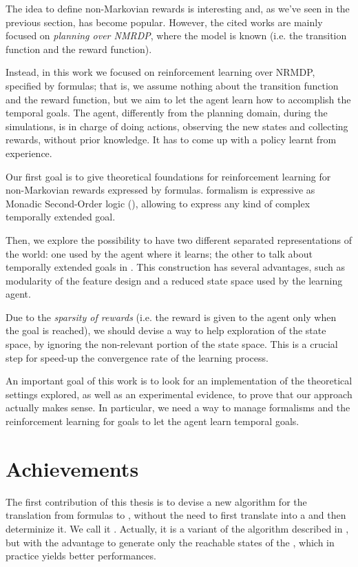 The idea to define non-Markovian rewards is interesting and, as we've seen in the previous section, has become popular. However, the cited works are mainly focused on \emph{planning over NMRDP}, where the model is known (i.e. the transition function and the reward function). 

Instead, in this work we focused on reinforcement learning over NRMDP, specified by \LLf formulas; that is, we assume nothing about the transition function and the reward function, but we aim to let the agent learn how to accomplish the temporal goals. The agent, differently from the planning domain, during the simulations, is in charge of doing actions, observing the new states and collecting rewards, without prior knowledge. It has to come up with a policy learnt from experience.

Our first goal is to give theoretical foundations for reinforcement learning for non-Markovian rewards expressed by \LLf formulas. \LDLf formalism is expressive as Monadic Second-Order logic (\MSO), allowing to express any kind of complex temporally extended goal.

Then, we explore the possibility to have two different separated representations of the world: one used by the agent where it learns; the other to talk about temporally extended goals in \LLf. This construction has several advantages, such as modularity of the feature design and a reduced state space used by the learning agent.

Due to the \emph{sparsity of rewards} (i.e. the reward is given to the agent only when the goal is reached), we should devise a way to help exploration of the state space, by ignoring the non-relevant portion of the state space. This is a crucial step for speed-up the convergence rate of the learning process.

An important goal of this work is to look for an implementation of the theoretical settings explored, as well as an experimental evidence, to prove that our approach actually makes sense. In particular, we need a way to manage \LLf formalisms and the reinforcement learning for \LLf goals to let the agent learn temporal goals.


\section{Achievements}\label{sect:intro-achievements}
The first contribution of this thesis is to devise a new algorithm for the translation from \LLf formulas to \DFA, without the need to first translate into a \NFA and then determinize it. We call it \LDLfToDFA. Actually, it is a variant of the \LDLfToNFA algorithm described in \citep{AAAI1817342}, but with the advantage to generate only the reachable states of the \DFA, which in practice yields better performances.

